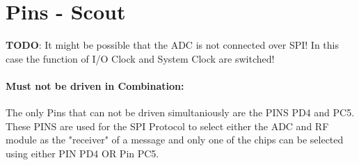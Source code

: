 \documentclass[12pt]{article}
\begin{document}
\lstset{language=C++}

\section*{Pins - Scout}

\textbf{TODO}: It might be possible that the ADC is not connected over SPI! In this case the function of I/O Clock and System Clock are switched!\\

\paragraph{Must not be driven in Combination:}
The only Pins that can not be driven simultaniously are the PINS PD4 and PC5. These PINS are used for the SPI Protocol to select either the ADC and RF module as the "receiver" of a message and only one of the chips can be selected using either PIN PD4 OR Pin PC5.\\
\end{document}
